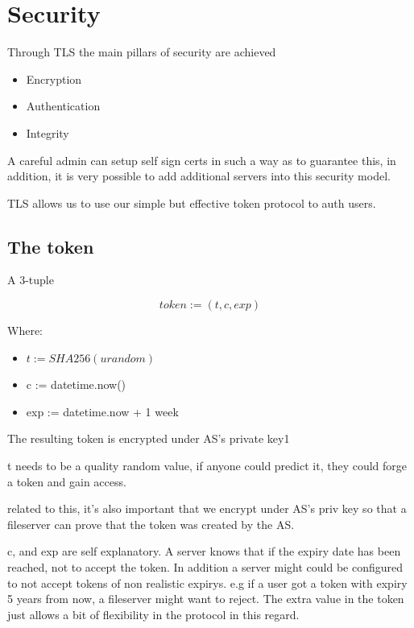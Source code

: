 \documentclass[11pt]{article}
\begin{document}
\section{Security}
\label{sec:org4eb9ee9}
Through TLS the main pillars of security are achieved
\begin{itemize}
\item Encryption
\item Authentication
\item Integrity
\end{itemize}

A careful admin can setup self sign certs in such a way as to guarantee this, in addition, it is very possible to add additional servers into this security model.

TLS allows us to use our simple but effective token protocol to auth users.

\subsection{The token}
\label{sec:org427503e}

A 3-tuple

$$ token := (t, c, exp) $$


Where:
\begin{itemize}
\item \(t := SHA256(urandom)\)
\item c := datetime.now()
\item exp := datetime.now + 1 week
\end{itemize}


The resulting token is encrypted under AS's private key1
\newline

t needs to be a quality random value, if anyone could predict it, they could forge a token and gain access.
\newline

related to this, it's also important that we encrypt under AS's priv key so that a fileserver can prove that the token was created by the AS.
\newline

c, and exp are self explanatory. A server knows that if the expiry date has been reached, not to accept the token. In addition a server might could be configured to not accept tokens of non realistic expirys.
e.g if a user got a token with expiry 5 years from now, a fileserver might want to reject. The extra value in the token just allows a bit of flexibility in the protocol in this regard. 
\end{document}

